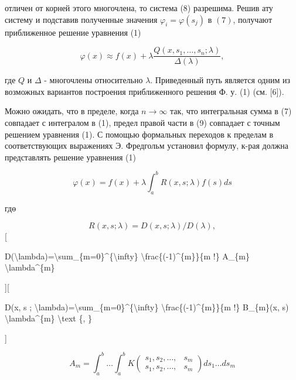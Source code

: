 \documentclass[10pt]{article}
\begin{document}
отличен от корней этого многочлена, то система (8) разрешима. Решив ату систему и подставив полученные значения $\varphi_{i}=\varphi\left(s_{j}\right)$ в $(7)$, получают приближенное решение уравнения (1)



\[

\varphi(x) \approx f(x)+\lambda \frac{Q\left(x, s_{1}, \ldots, s_{n} ; \lambda\right)}{\Delta(\lambda)},

\]



где $Q$ и $\Delta$ - многочлены относительно $\lambda$. Приведенный путь является одним из возможных вариантов построения приближенного решения Ф. у. (1) (см. [6]).



Можно ожидать, что в пределе, когда $n \rightarrow \infty$ так, что интегральная сумма в (7) совпадает с интегралом в (1), предел правой части в (9) совпадает с точным решением уравнения (1). С помощью формальных переходов к пределам в соответствующих выражениях Э. Фредгольм установил формулу, к-рая должна представлять решение уравнения (1)



\[

\varphi(x)=f(x)+\lambda \int_{a}^{b} R(x, s ; \lambda) f(s) d s

\]



гдө



\[

R(x, s ; \lambda)=D(x, s ; \lambda) / D(\lambda),

\][



D(\textbackslash lambda)=\textbackslash sum\_\{m=0\}\^{}\{\textbackslash infty\} \textbackslash frac\{(-1)\^{}\{m\}\}\{m !\} A\_\{m\} \textbackslash lambda\^{}\{m\}



][



D(x, s ; \textbackslash lambda)=\textbackslash sum\_\{m=0\}\^{}\{\textbackslash infty\} \textbackslash frac\{(-1)\^{}\{m\}\}\{m !\} B\_\{m\}(x, s) \textbackslash lambda\^{}\{m\} \textbackslash text \{, \}

]



\[

A_{m}=\int_{a}^{b} \ldots \int_{a}^{b} K\left(\begin{array}{lll}

s_{1}, s_{2}, \ldots, & s_{m} \\

s_{1}, s_{2}, \ldots, & s_{m}

\end{array}\right) d s_{1} \ldots d s_{m}

\]
\end{document}
